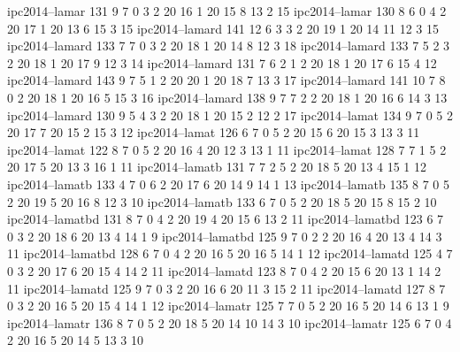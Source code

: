 ipc2014--lamar    131  9    7    0    3    2    20   16   1    20   15   8    13   2    15
ipc2014--lamar    130  8    6    0    4    2    20   17   1    20   13   6    15   3    15
ipc2014--lamard   141  12   6    3    3    2    20   19   1    20   14   11   12   3    15
ipc2014--lamard   133  7    7    0    3    2    20   18   1    20   14   8    12   3    18
ipc2014--lamard   133  7    5    2    3    2    20   18   1    20   17   9    12   3    14
ipc2014--lamard   131  7    6    2    1    2    20   18   1    20   17   6    15   4    12
ipc2014--lamard   143  9    7    5    1    2    20   20   1    20   18   7    13   3    17
ipc2014--lamard   141  10   7    8    0    2    20   18   1    20   16   5    15   3    16
ipc2014--lamard   138  9    7    7    2    2    20   18   1    20   16   6    14   3    13
ipc2014--lamard   130  9    5    4    3    2    20   18   1    20   15   2    12   2    17
ipc2014--lamat    134  9    7    0    5    2    20   17   7    20   15   2    15   3    12
ipc2014--lamat    126  6    7    0    5    2    20   15   6    20   15   3    13   3    11
ipc2014--lamat    122  8    7    0    5    2    20   16   4    20   12   3    13   1    11
ipc2014--lamat    128  7    7    1    5    2    20   17   5    20   13   3    16   1    11
ipc2014--lamatb   131  7    7    2    5    2    20   18   5    20   13   4    15   1    12
ipc2014--lamatb   133  4    7    0    6    2    20   17   6    20   14   9    14   1    13
ipc2014--lamatb   135  8    7    0    5    2    20   19   5    20   16   8    12   3    10
ipc2014--lamatb   133  6    7    0    5    2    20   18   5    20   15   8    15   2    10
ipc2014--lamatbd  131  8    7    0    4    2    20   19   4    20   15   6    13   2    11
ipc2014--lamatbd  123  6    7    0    3    2    20   18   6    20   13   4    14   1    9
ipc2014--lamatbd  125  9    7    0    2    2    20   16   4    20   13   4    14   3    11
ipc2014--lamatbd  128  6    7    0    4    2    20   16   5    20   16   5    14   1    12
ipc2014--lamatd   125  4    7    0    3    2    20   17   6    20   15   4    14   2    11
ipc2014--lamatd   123  8    7    0    4    2    20   15   6    20   13   1    14   2    11
ipc2014--lamatd   125  9    7    0    3    2    20   16   6    20   11   3    15   2    11
ipc2014--lamatd   127  8    7    0    3    2    20   16   5    20   15   4    14   1    12
ipc2014--lamatr   125  7    7    0    5    2    20   16   5    20   14   6    13   1    9
ipc2014--lamatr   136  8    7    0    5    2    20   18   5    20   14   10   14   3    10
ipc2014--lamatr   125  6    7    0    4    2    20   16   5    20   14   5    13   3    10
